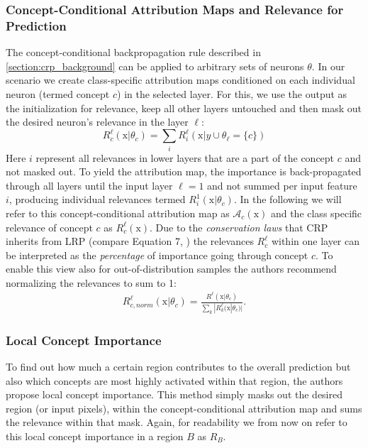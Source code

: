 \subsubsection{Concept-Conditional Attribution Maps and Relevance for Prediction}
The concept-conditional backpropagation rule described in \cref{section:crp_background} can be applied to arbitrary sets of neurons $\theta$. In our scenario we create class-specific attribution maps conditioned on each individual neuron (termed concept $c$) in the selected layer. For this, we use the output as the initialization for relevance, keep all other layers untouched and then mask out the desired neuron's relevance in the layer $\ell$: 
\begin{equation}
    R^{\ell}_{c}(\mathrm{x} |\theta_{c}) = \sum_{i} R_i^{\ell}(\mathrm{x} |y \cup \theta_{\ell} = \{c\})
\end{equation}
Here $i$ represent all relevances in lower layers that are a part of the concept $c$ and not masked out. 
To yield the attribution map, the importance is back-propagated through all layers until the input layer $\ell = 1$ and not summed per input feature $i$, producing individual relevances termed $R_{i}^{1}(\mathrm{x} |\theta_{c})$. In the following we will refer to this concept-conditional attribution map as $\mathcal{A}_c(\mathrm{x})$ and the class specific relevance of concept $c$ as $R_c^{\ell}(\mathrm{x})$. Due to the \textit{conservation laws} that CRP inherits from LRP (compare Equation 7, \cite{Achtibat2022}) the relevances $R_c^{\ell}$ within one layer can be interpreted as the \textit{percentage} of importance going through concept $c$. To enable this view also for out-of-distribution samples the authors recommend normalizing the relevances to sum to 1:
\begin{align}\label{eq:normed_relevance}
    R^{\ell}_{c,norm}(\mathrm{x} |\theta_{c}) = \frac{R^{\ell}(\mathrm{x} |\theta_{c}) }{\sum_k |R_k^{\ell}(\mathrm{x} |\theta_{c})|}.
\end{align}

\subsubsection{Local Concept Importance}
To find out how much a certain region contributes to the overall prediction but also which concepts are most highly activated within that region, the authors propose local concept importance. 
This method simply masks out the desired region (or input pixels), within the concept-conditional attribution map and sums the relevance within that mask. 
Again, for readability we from now on refer to this local concept importance in a region $B$ as $R_B$.

